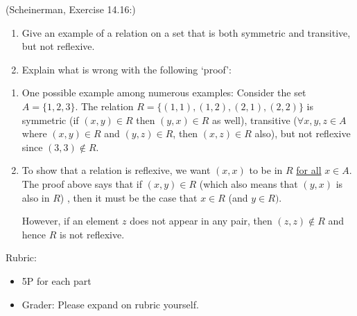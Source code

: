 \documentclass{article}
\theoremstyle{definition}
\begin{document}
\begin{question}
    (Scheinerman, Exercise 14.16:)
    \begin{enumerate}
        \item Give an example of a relation on a set that is both symmetric and transitive, but not reflexive.
        \item Explain what is wrong with the following `proof':
        
    \end{enumerate}
\end{question}
\begin{solution}
    \begin{enumerate}
    \item One possible example among numerous examples: Consider the set $A = \{1, 2, 3\}$.  The relation $R = \{ (1, 1), (1, 2), (2, 1), (2, 2) \}$ is symmetric (if $(x, y) \in R$ then $(y, x) \in R$ as well), transitive ($\forall x, y,z \in A$ where $(x, y)\in R$ and $(y, z) \in R$, then $(x, z) \in R$ also), but not reflexive since $(3, 3) \notin R$.
    \item To show that a relation is reflexive, we want $(x, x)$ to be in $R$ \underline{for all} $x \in A$.  The proof above says that if $(x, y) \in R$ (which also means that $(y, x)$ is also in $R$) , then it must be the case that $x \in R$ (and $y \in R)$.  

    However, if an element $z$ does not appear in any pair, then $(z, z) \notin R$ and hence $R$ is not reflexive.
    \end{enumerate}
{\color{red} Rubric:
\begin{itemize}
\item 5P for each part
\item Grader: Please expand on rubric yourself.
\end{itemize}}
\end{solution}
\end{document}
